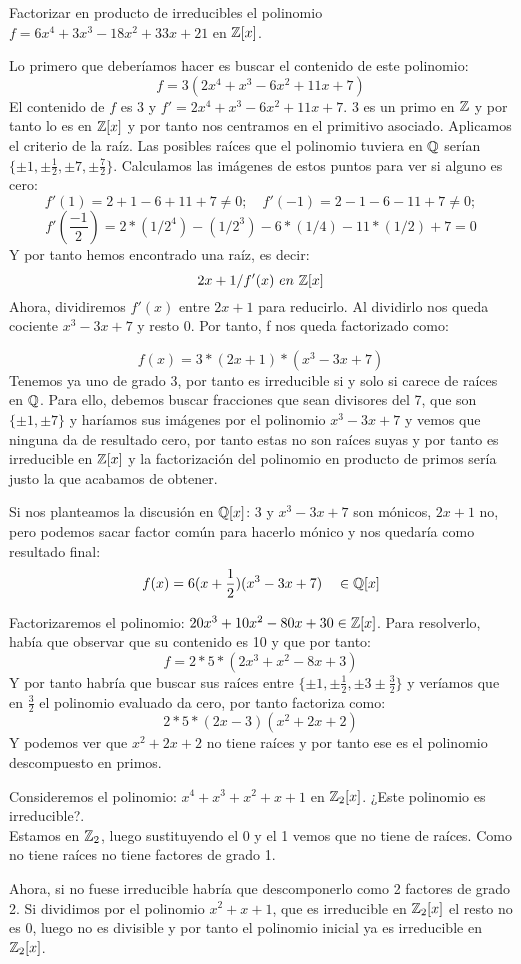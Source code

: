 \begin{ejemplo}
	Factorizar en producto de irreducibles el polinomio $f=6x^4+3x^3-18x^2+33x+21$ en $\mathbb{Z}[x]$.

Lo primero que deberíamos hacer es buscar el contenido de este polinomio:
\[
f=3(2x^4+x^3-6x^2+11x+7)
\]
El contenido de $f$ es 3 y $f'=2x^4+x^3-6x^2+11x+7$. 3 es un primo en $\mathbb{Z} $ y por tanto lo es en $\mathbb{Z}[x]$ y por tanto nos centramos en el primitivo asociado. Aplicamos el criterio de la raíz. Las posibles raíces que el polinomio tuviera en $\mathbb{Q}$ serían $\{\pm 1, \pm \frac{1}{2}, \pm 7, \pm \frac{7}{2}\}$. Calculamos las imágenes de estos puntos para ver si alguno es cero:
\[
f'(1) = 2+1-6+11 + 7 \ne 0; \quad f'(-1) = 2-1-6-11+7 \ne 0;\]
\[f'(\frac{-1}{2}) = 2*(1/2^4)-(1/2^3)-6*(1/4)-11*(1/2) + 7 = 0
\]
Y por tanto hemos encontrado una raíz, es decir:
\[
2x+1/f'(x) \ en \ \mathbb{Z}[x]
\]
Ahora, dividiremos $f'(x)$ entre $2x+1$ para reducirlo. Al dividirlo nos queda cociente $x^3-3x+7$ y resto 0. Por tanto, f nos queda factorizado como:

\[
f(x)=3*(2x+1)*(x^3-3x+7)
\]
Tenemos ya uno de grado 3, por tanto es irreducible si y solo si carece de raíces en $\mathbb{Q}$. Para ello, debemos buscar fracciones que sean divisores del 7, que son $\{\pm 1, \pm 7\}$ y haríamos sus imágenes por el polinomio $x^3-3x+7$ y vemos que ninguna da de resultado cero, por tanto estas no son raíces suyas y por tanto es irreducible en $\mathbb{Z}[x]$ y la factorización del polinomio en producto de primos sería justo la que acabamos de obtener.

Si nos planteamos la discusión en $\mathbb{Q}[x]$: 3 y $x^3-3x+7$ son mónicos, $2x+1$ no, pero podemos sacar factor común para hacerlo mónico y nos quedaría como resultado final:
\[
f(x)= 6(x+\frac{1}{2})(x^3-3x+7) \quad \in \mathbb{Q}[x]
\]
\end{ejemplo}
\begin{ejemplo}[2]
	Factorizaremos el polinomio: $20x^3 +10x^2-80x+30 \in \mathbb{Z}[x]$. Para resolverlo, había que observar que su contenido es 10 y que por tanto:
	\[
	f=2*5*(2x^3+x^2-8x+3)
	\]
	Y por tanto habría que buscar sus raíces entre $\{\pm 1, \pm \frac{1}{2}, \pm 3 \pm \frac{3}{2}\}$ y veríamos que en $\frac{3}{2}$ el polinomio evaluado da cero, por tanto factoriza como:
	\[
	2*5*(2x-3)(x^2+2x+2)
	\]
	Y podemos ver que $x^2+2x+2$ no tiene raíces y por tanto ese es el polinomio descompuesto en primos.
\end{ejemplo}
\begin{ejemplo}[3]
	Consideremos el polinomio: $x^4+x^3+x^2+x+1$ en $\mathbb{Z}_2[x]$. ¿Este polinomio es irreducible?. \\Estamos en $\mathbb{Z}_2$, luego sustituyendo el 0 y el 1 vemos que no tiene de raíces. Como no tiene raíces no tiene factores de grado 1.

	Ahora, si no fuese irreducible habría que descomponerlo como 2 factores de grado 2. Si dividimos por el polinomio $x^2+x+1$, que es irreducible en $\mathbb{Z}_2[x]$ el resto no es 0, luego no es divisible y por tanto el polinomio inicial ya es irreducible en $\mathbb{Z}_2[x]$.
\end{ejemplo}

